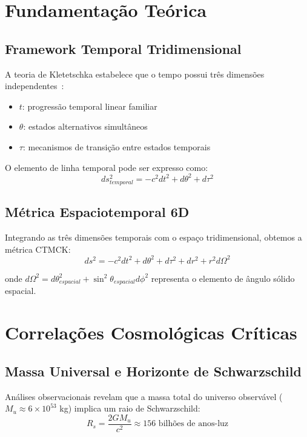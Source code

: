 \documentclass[reprint,amsmath,amssymb,aps,prd]{revtex4-2}
\begin{document}
\section{Fundamentação Teórica}

\subsection{Framework Temporal Tridimensional}

A teoria de Kletetschka estabelece que o tempo possui três dimensões independentes~\cite{kletetschka2025}:
\begin{itemize}
\item $t$: progressão temporal linear familiar
\item $\theta$: estados alternativos simultâneos  
\item $\tau$: mecanismos de transição entre estados temporais
\end{itemize}

O elemento de linha temporal pode ser expresso como:
\begin{equation}
ds^2_{temporal} = -c^2dt^2 + d\theta^2 + d\tau^2
\end{equation}

\subsection{Métrica Espaciotemporal 6D}

Integrando as três dimensões temporais com o espaço tridimensional, obtemos a métrica CTMCK:
\begin{equation}
ds^2 = -c^2dt^2 + d\theta^2 + d\tau^2 + dr^2 + r^2d\Omega^2
\end{equation}

onde $d\Omega^2 = d\theta_{espacial}^2 + \sin^2\theta_{espacial}d\phi^2$ representa o elemento de ângulo sólido espacial.

\section{Correlações Cosmológicas Críticas}

\subsection{Massa Universal e Horizonte de Schwarzschild}

Análises observacionais revelam que a massa total do universo observável ($M_u \approx 6 \times 10^{53}$ kg) implica um raio de Schwarzschild:
\begin{equation}
R_s = \frac{2GM_u}{c^2} \approx 156 \text{ bilhões de anos-luz}
\end{equation}
\end{document}
